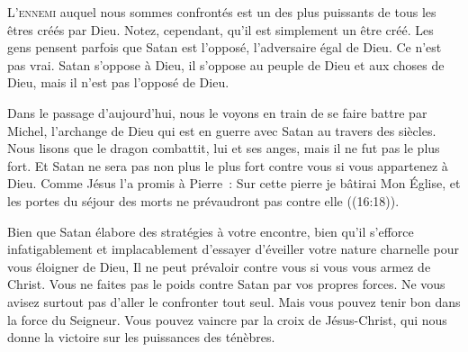 

\lettrine{L}{'ennemi} auquel nous sommes confrontés est un des plus puissants
 de tous les êtres créés par Dieu. Notez, cependant, qu'il est simplement
 un être créé. Les gens pensent parfois que Satan est l'opposé,
 l'adversaire égal de Dieu. Ce n'est pas vrai. Satan s'oppose à Dieu,
 il s'oppose au peuple de Dieu et aux choses de Dieu,
 mais il n'est pas l'opposé de Dieu.


Dans le passage d'aujourd'hui, nous le voyons en train de se faire battre
 par Michel, l'archange de Dieu qui est en guerre avec Satan
 au travers des siècles. Nous lisons que 
 \og le dragon combattit, lui et ses anges,
 mais il ne fut pas le plus fort. \fg{}
 Et Satan ne sera pas non plus le plus fort contre vous
 si vous appartenez à Dieu. Comme Jésus l'a promis à Pierre~: 
 \og Sur cette pierre je bâtirai Mon Église, et les portes du séjour
 des morts ne prévaudront pas contre elle \fg{} ((16:18)).

Bien que Satan élabore des stratégies à votre encontre,
 bien qu'il s'efforce infatigablement et implacablement d'essayer d'éveiller
 votre nature charnelle pour vous éloigner de Dieu, Il ne peut prévaloir
 contre vous si vous vous armez de Christ.
 Vous ne faites pas le poids contre Satan par vos propres forces.
 Ne vous avisez surtout pas d'aller le confronter tout seul.
 Mais vous pouvez tenir bon dans la force du Seigneur.
 Vous pouvez vaincre par la croix de Jésus-Christ,
 qui nous donne la victoire sur les puissances des ténèbres.

\dvrule






